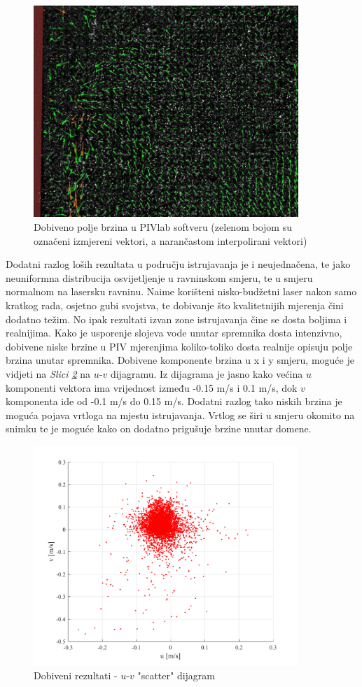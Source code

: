 \begin{figure}[h]  
	\centering
	\includegraphics[width=10cm]{./7_LowCostPIV/slika7_9.jpg} 
	\caption{Dobiveno polje brzina u PIVlab softveru (zelenom bojom su označeni izmjereni vektori, a narančastom interpolirani vektori)}
	\label{sl:7.9}
\end{figure}
\par
Dodatni razlog loših rezultata u području istrujavanja je i neujednačena, te jako neuniformna distribucija osvijetljenje u ravninskom smjeru, te u smjeru normalnom na lasersku ravninu. Naime korišteni nisko-budžetni laser nakon samo kratkog rada, osjetno gubi svojstva, te dobivanje što kvalitetnijih mjerenja čini dodatno težim. No ipak rezultati izvan zone istrujavanja čine se dosta boljima i realnijima. Kako je usporenje slojeva vode unutar spremnika dosta intenzivno, dobivene niske brzine u PIV mjerenjima koliko-toliko dosta realnije opisuju polje brzina unutar spremnika. Dobivene komponente brzina u x i y smjeru, moguće je vidjeti na \textit{Slici \ref{sl:7.10}} na $u$-$v$ dijagramu. Iz dijagrama je jasno kako većina $u$ komponenti vektora ima vrijednost između -0.15 m/s i 0.1 m/s, dok $v$ komponenta ide od -0.1 m/s do 0.15 m/s. Dodatni razlog tako niskih brzina je moguća pojava vrtloga na mjestu istrujavanja. Vrtlog se širi u smjeru okomito na snimku te je moguće kako on dodatno prigušuje brzine unutar domene.
\begin{figure}[h]  
	\centering
	\includegraphics[width=10cm]{./7_LowCostPIV/slika7_10.pdf} 
	\caption{Dobiveni rezultati - $u$-$v$ "scatter" dijagram}
	\label{sl:7.10}
\end{figure}
